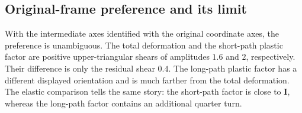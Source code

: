 \documentclass[11pt]{article}
\begin{document}
\subsection{Original-frame preference and its limit}

With the intermediate axes identified with the original coordinate axes, the
preference is unambiguous.  The total deformation and the short-path plastic
factor are positive upper-triangular shears of amplitudes \(1.6\) and \(2\),
respectively.  Their difference is only the residual shear \(0.4\).  The
long-path plastic factor has a different displayed orientation and is much
farther from the total deformation.  The elastic comparison tells the same
story: the short-path factor is close to \(\mathbf I\), whereas the long-path
factor contains an additional quarter turn.
\end{document}

